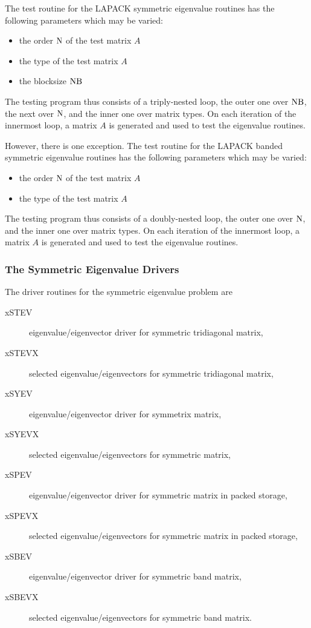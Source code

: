 \dent
The test routine for the LAPACK symmetric eigenvalue routines
has the following parameters which may be varied:
\begin{itemize}
\item	the order ${\rm N}$ of the test matrix $A$
\item	the type of the test matrix $A$
\item	the blocksize ${\rm NB}$
\end{itemize}
The testing program thus consists of a triply-nested
loop, the outer one over ${\rm NB}$, the next
over ${\rm N}$, and the inner one over matrix types.
On each iteration of the innermost loop,
a matrix $A$ is generated and used
to test the eigenvalue routines.

\dent
However, there is one exception.  The test routine for the LAPACK 
banded symmetric eigenvalue routines
has the following parameters which may be varied:
\begin{itemize}
\item	the order ${\rm N}$ of the test matrix $A$
\item	the type of the test matrix $A$
\end{itemize}
The testing program thus consists of a doubly-nested
loop, the outer one over ${\rm N}$,
and the inner one over matrix types.
On each iteration of the innermost loop,
a matrix $A$ is generated and used
to test the eigenvalue routines.

\subsubsection{The Symmetric Eigenvalue Drivers}

The driver routines for the symmetric eigenvalue problem are
\begin{description}
\item[xSTEV] eigenvalue/eigenvector driver for symmetric tridiagonal matrix,
\item[xSTEVX] selected eigenvalue/eigenvectors for symmetric tridiagonal
matrix,
\item[xSYEV] eigenvalue/eigenvector driver for symmetrix matrix, 
\item[xSYEVX] selected eigenvalue/eigenvectors for symmetric matrix,
\item[xSPEV] eigenvalue/eigenvector driver for symmetric matrix in
packed storage,
\item[xSPEVX] selected eigenvalue/eigenvectors for symmetric matrix in
packed storage,
\item[xSBEV] eigenvalue/eigenvector driver for symmetric band matrix,
\item[xSBEVX] selected eigenvalue/eigenvectors for symmetric band
matrix.
\end{description}

